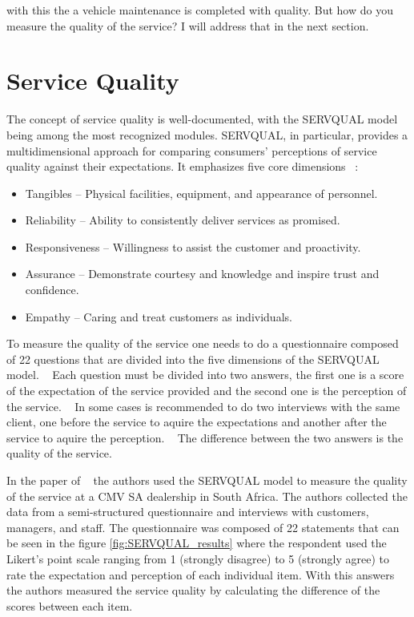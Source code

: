 with this the a vehicle maintenance is completed with quality. 
But how do you measure the quality of the service?
I will address that in the next section.

\section{Service Quality}
The concept of service quality is well-documented, with the SERVQUAL model being among the most recognized modules. 
SERVQUAL, in particular, provides a multidimensional approach for comparing consumers' perceptions of service quality against their expectations. 
It emphasizes five core dimensions ~\cite{SERVQUAL_OLD}:

\begin{itemize}
  \item Tangibles – Physical facilities, equipment, and appearance of personnel.
  \item Reliability – Ability to consistently deliver services as promised.
  \item Responsiveness – Willingness to assist the customer and proactivity.
  \item Assurance – Demonstrate courtesy and knowledge and inspire trust and confidence.
  \item Empathy – Caring and treat customers as individuals.
\end{itemize}

To measure the quality of the service one needs to do a questionnaire composed of 22 questions that are divided into the five dimensions of the SERVQUAL model. ~\cite{Measuring_After_sales_Service_Quality}
Each question must be divided into two answers, the first one is a score of the expectation of the service provided and the second one is the perception of the service. ~\cite{Measuring_After_sales_Service_Quality}
In some cases is recommended to do two interviews with the same client, one before the service to aquire the expectations and another after the service to aquire the perception. ~\cite{servqual_blog_da_qualidade}
The difference between the two answers is the quality of the service. ~\cite{servqual_blog_da_qualidade} ~\cite{Measuring_After_sales_Service_Quality} ~\cite{SERVQUAL_OLD}

In the paper of ~\cite{Measuring_After_sales_Service_Quality} the authors used the SERVQUAL model to measure the quality of the service at a CMV SA dealership in South Africa.
The authors collected the data from a semi-structured questionnaire and interviews with customers, managers, and staff.
The questionnaire was composed of 22 statements that can be seen in the figure \ref{fig:SERVQUAL_results} where the respondent used the Likert's point scale ranging from 1 (strongly disagree) to 5 (strongly agree) to rate the expectation and perception of each individual item.
With this answers the authors measured the service quality by calculating the difference of the scores between each item.
 
